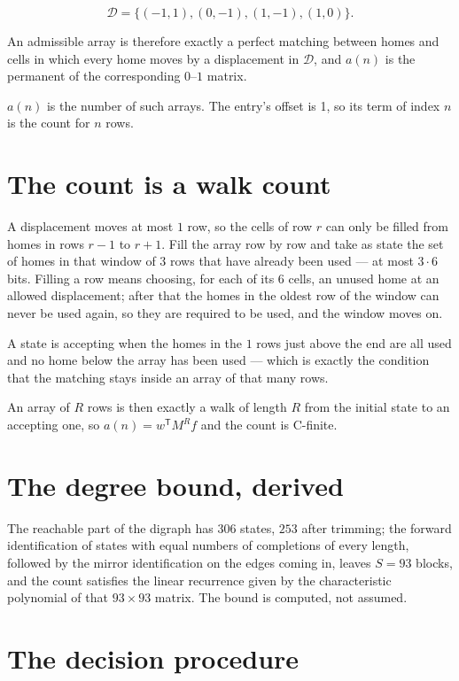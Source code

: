\documentclass[11pt]{article}
\theoremstyle{definition}
\begin{document}
\[\mathcal{D} = \{(-1,1), (0,-1), (1,-1), (1,0)\}.\]

An admissible array is therefore exactly a perfect matching between homes and cells in which every home moves by a displacement in $\mathcal{D}$, and $a(n)$ is the permanent of the corresponding $0$--$1$ matrix.

$a(n)$ is the number of such arrays. The entry's offset is 1, so its term of index $n$ is the count for $n$ rows.

\section{The count is a walk count}

A displacement moves at most $1$ row, so the cells of row $r$ can only be filled from homes in rows $r-1$ to $r+1$. Fill the array row by row and take as state the set of homes in that window of $3$ rows that have already been used --- at most $3\cdot6$ bits. Filling a row means choosing, for each of its $6$ cells, an unused home at an allowed displacement; after that the homes in the oldest row of the window can never be used again, so they are required to be used, and the window moves on.

A state is accepting when the homes in the $1$ rows just above the end are all used and no home below the array has been used --- which is exactly the condition that the matching stays inside an array of that many rows.

An array of $R$ rows is then exactly a walk of length $R$ from the initial state to an accepting one, so $a(n) = w^{\mathsf T}M^{R}f$ and the count is C-finite.

\section{The degree bound, derived}

The reachable part of the digraph has $306$ states, $253$ after trimming; the forward identification of states with equal numbers of completions of every length, followed by the mirror identification on the edges coming in, leaves $S = 93$ blocks, and the count satisfies the linear recurrence given by the characteristic polynomial of that $93\times93$ matrix. The bound is computed, not assumed.

\section{The decision procedure}
\end{document}
